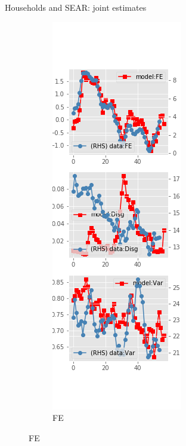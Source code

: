 \documentclass{beamer}
\begin{document}
\begin{frame}{Households and SEAR: joint estimates}
	\begin{figure}[ht]
		\label{SE_diag_SCE_joint}
		\begin{subfigure}[b]{0.2\textwidth}
			\centering
			\caption{FE}
			\includegraphics[width=\textwidth, height = 0.8\textheight]{figuresDraft/sce_se_est_diag0.png}

\end{subfigure}
\end{figure}
\end{frame}
\end{document}
